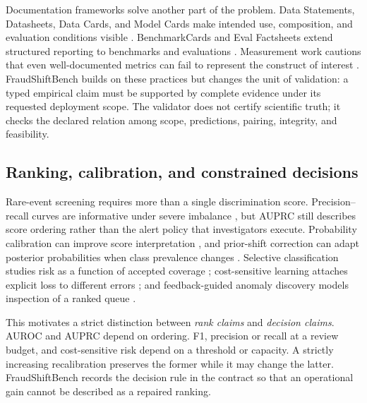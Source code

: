 Documentation frameworks solve another part of the problem. Data Statements, Datasheets, Data Cards, and Model Cards make intended use, composition, and evaluation conditions visible \cite{bender2018data,gebru2021datasheets,pushkarna2022datacards,mitchell2019modelcards}. BenchmarkCards and Eval Factsheets extend structured reporting to benchmarks and evaluations \cite{sokol2025benchmarkcards,bordes2025evalfacts}. Measurement work cautions that even well-documented metrics can fail to represent the construct of interest \cite{jacobs2021measurement}. FraudShiftBench builds on these practices but changes the unit of validation: a typed empirical claim must be supported by complete evidence under its requested deployment scope. The validator does not certify scientific truth; it checks the declared relation among scope, predictions, pairing, integrity, and feasibility.

\subsection{Ranking, calibration, and constrained decisions}
Rare-event screening requires more than a single discrimination score. Precision--recall curves are informative under severe imbalance \cite{saito2015pr}, but AUPRC still describes score ordering rather than the alert policy that investigators execute. Probability calibration can improve score interpretation \cite{guo2017calibration}, and prior-shift correction can adapt posterior probabilities when class prevalence changes \cite{saerens2002prior}. Selective classification studies risk as a function of accepted coverage \cite{geifman2017selective}; cost-sensitive learning attaches explicit loss to different errors \cite{bahnsen2015cost}; and feedback-guided anomaly discovery models inspection of a ranked queue \cite{siddiqui2018feedback}.

This motivates a strict distinction between \emph{rank claims} and \emph{decision claims}. AUROC and AUPRC depend on ordering. F1, precision or recall at a review budget, and cost-sensitive risk depend on a threshold or capacity. A strictly increasing recalibration preserves the former while it may change the latter. FraudShiftBench records the decision rule in the contract so that an operational gain cannot be described as a repaired ranking.


